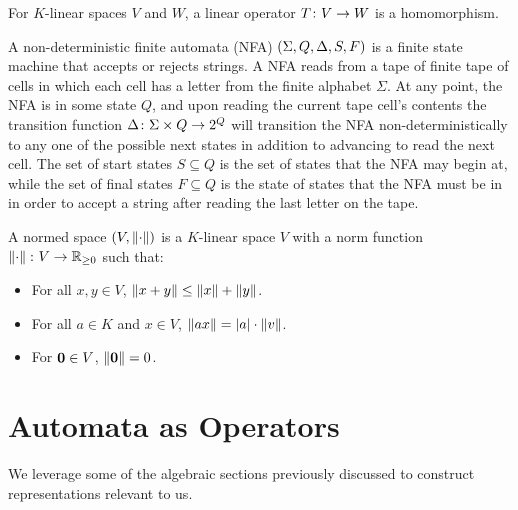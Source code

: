 \documentclass[12pt]{article}
\begin{document}
\begin{definition}
  For \(K\)-linear spaces \(V\) and \(W\), a linear operator
  \(T \colon V \to W\) is a homomorphism.
\end{definition}


\begin{definition}
  A non-deterministic finite automata (NFA)
  \(\left(\Sigma, Q, \Delta, S, F\right)\)
  is a finite state machine that accepts or rejects strings.
  A NFA reads from a tape of finite tape of cells in which each cell
  has a letter from the finite alphabet \(\Sigma\).
  At any point, the NFA is in some state \(Q\), and
  upon reading the current tape cell's contents
  the transition function \(\Delta \colon \Sigma \times Q \to 2^{Q}\)
  will transition the NFA non-deterministically to any one of
  the possible next states in addition to advancing to read the next cell.
  The set of start states \(S \subseteq Q\) is the set of states
  that the NFA may begin at,
  while the set of final states \(F \subseteq Q\) is the state of states
  that the NFA must be in in order to accept a string
  after reading the last letter on the tape.
\end{definition}


\begin{definition}[Norm]
  A normed space \(\left(V, \left\lVert\cdot\right\rVert\right)\) is a \(K\)-linear space \(V\)
  with a norm function \(\left\lVert\cdot\right\rVert \colon V \to \mathbb{R}_{\geq 0}\) such that:
  \begin{itemize}
    \item
      For all \(x, y \in V\), \(\left\lVert x + y\right\rVert \leq \left\lVert x\right\rVert + \left\lVert y\right\rVert\).

    \item
      For all \(a \in K\) and \(x \in V\),
      \(\left\lVert ax\right\rVert = \left\lvert a\right\rvert \cdot \left\lVert v\right\rVert\).

    \item
      For \(\mathbf{0} \in V\), \(\left\lVert\mathbf{0}\right\rVert = 0\).
  \end{itemize}
\end{definition}

\section{Automata as Operators}

We leverage some of the algebraic sections previously discussed to
construct representations relevant to us.
\end{document}
